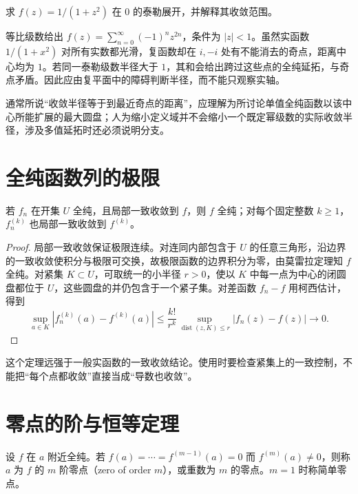 \begin{example}[实轴上的光滑不能决定泰勒半径]
求 $f(z)=1/(1+z^2)$ 在 $0$ 的泰勒展开，并解释其收敛范围。
\end{example}
\begin{solve}
等比级数给出 $f(z)=\sum_{n=0}^\infty(-1)^nz^{2n}$，条件为 $|z|<1$。虽然实函数 $1/(1+x^2)$ 对所有实数都光滑，复函数却在 $i,-i$ 处有不能消去的奇点，距离中心均为 $1$。若同一泰勒级数半径大于 $1$，其和会给出跨过这些点的全纯延拓，与奇点矛盾。因此应由复平面中的障碍判断半径，而不能只观察实轴。
\end{solve}

通常所说“收敛半径等于到最近奇点的距离”，应理解为所讨论单值全纯函数以该中心所能扩展的最大圆盘；人为缩小定义域并不会缩小一个既定幂级数的实际收敛半径，涉及多值延拓时还必须说明分支。

\section{全纯函数列的极限}

\begin{theorem}[局部一致极限定理]
\label{thm:ca-uniform-limit}
若 $f_n$ 在开集 $U$ 全纯，且局部一致收敛到 $f$，则 $f$ 全纯；对每个固定整数 $k\ge1$，$f_n^{(k)}$ 也局部一致收敛到 $f^{(k)}$。
\end{theorem}
\begin{proof}
局部一致收敛保证极限连续。对连同内部包含于 $U$ 的任意三角形，沿边界的一致收敛使积分与极限可交换，故极限函数的边界积分为零，由莫雷拉定理知 $f$ 全纯。对紧集 $K\subset U$，可取统一的小半径 $r>0$，使以 $K$ 中每一点为中心的闭圆盘都位于 $U$，这些圆盘的并仍包含于一个紧子集。对差函数 $f_n-f$ 用柯西估计，得到
\[
 \sup_{a\in K}|f_n^{(k)}(a)-f^{(k)}(a)|
 \le\frac{k!}{r^k}\sup_{\operatorname{dist}(z,K)\le r}|f_n(z)-f(z)|\longrightarrow0.
\]
\end{proof}

这个定理远强于一般实函数的一致收敛结论。使用时要检查紧集上的一致控制，不能把“每个点都收敛”直接当成“导数也收敛”。

\section{零点的阶与恒等定理}

\begin{definition}[零点的阶]
设 $f$ 在 $a$ 附近全纯。若 $f(a)=\cdots=f^{(m-1)}(a)=0$ 而 $f^{(m)}(a)\ne0$，则称 $a$ 为 $f$ 的 $m$ 阶零点（zero of order $m$），或重数为 $m$ 的零点。$m=1$ 时称简单零点。
\end{definition}


